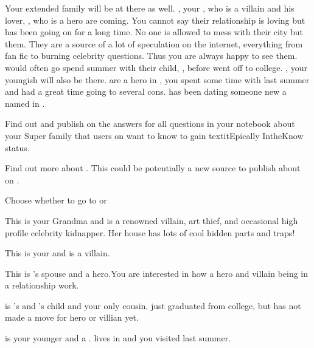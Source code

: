 \documentclass[char]{LRSguildcamp1}
\begin{document}
{Your extended family will be at there as well. \cOldest{}, your \cOldest{\uncle}, who is a villain and his lover, \cOS{}, who is a hero are coming. You cannot say their relationship is loving but has been going on for a long time. No one is allowed to mess with their city but them. They are a source of a lot of speculation on the internet, everything from fan fic to burning celebrity questions. Thus you are always happy to see them. \cTeen{} would often go spend summer with their child, \cGrad{}, before \cGrad{\they} went off to college.  \cYoungest{}, your youngish \cYoungest{\uncle} will also be there.  are a hero in \pCityYoungest{}, you spent some time with \cYoungest{\them} last summer and had a great time going to several cons.  \cYoungest{} has been dating someone new a \cAS{\hero} named \cAS{} in \pCityYoungest{}. 



\begin{itemz}[Goals]
	\item Find out and publish on \pTweenwebsite{} the answers for all questions in your notebook about your Super family that users on \pTweenwebsite{} want to know to gain textit{Epically IntheKnow} status. 
	\item Find out more about \cAS{}. This could be potentially a new source to publish about on \pTweenwebsite{}.
	\item Choose whether to go to \pSuperSchool{} or \pNormalSchool{}
\end{itemz}

\begin{itemz}[Notes]
	\item 
\end{itemz}
\begin{contacts}
	\contact{\cGrandma{}} This is your Grandma and is a renowned villain, art thief, and occasional high profile celebrity kidnapper. Her house has lots of cool hidden parts and traps!
	
	\contact{\cOldest{}} This is your \cOldest{\uncle} and is a villain. 
	
	\contact{\cOS{}} This is \cOldest{}'s spouse and a hero.You are interested in how a hero and villain being in a relationship work. 
	
	\contact{\cGrad{}} \cGrad{} is \cOldest{}'s and \cOS{}'s child and your only cousin. \cGrad{\They} just graduated from college, but has not made a move for hero or villian yet. 
	
	\contact{\cYoungest{}} \cYoungest{} is your younger \cYoungest{\uncle} and a \cYoungest{\hero}. \cYoungest{} lives in \pCityYoungest{} and you visited \cYoungest{\them} last summer.  
	

\end{contacts}}
\end{document}

